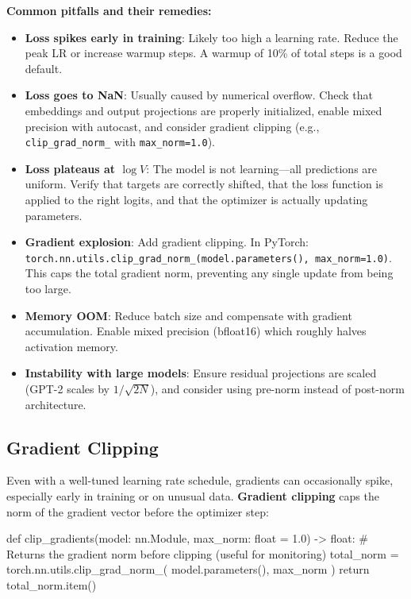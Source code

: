 \begin{keyconcept}
  \textbf{Common pitfalls and their remedies:}
  \begin{itemize}
    \item \textbf{Loss spikes early in training}: Likely too high a learning rate. Reduce the peak LR or increase warmup steps. A warmup of 10\% of total steps is a good default.
    \item \textbf{Loss goes to NaN}: Usually caused by numerical overflow. Check that embeddings and output projections are properly initialized, enable mixed precision with autocast, and consider gradient clipping (e.g., \texttt{clip\_grad\_norm\_} with \texttt{max\_norm=1.0}).
    \item \textbf{Loss plateaus at $\log V$}: The model is not learning---all predictions are uniform. Verify that targets are correctly shifted, that the loss function is applied to the right logits, and that the optimizer is actually updating parameters.
    \item \textbf{Gradient explosion}: Add gradient clipping. In PyTorch: \texttt{torch.nn.utils.clip\_grad\_norm\_(model.parameters(), max\_norm=1.0)}. This caps the total gradient norm, preventing any single update from being too large.
    \item \textbf{Memory OOM}: Reduce batch size and compensate with gradient accumulation. Enable mixed precision (bfloat16) which roughly halves activation memory.
    \item \textbf{Instability with large models}: Ensure residual projections are scaled (GPT-2 scales by $1/\sqrt{2N}$), and consider using pre-norm instead of post-norm architecture.
  \end{itemize}
\end{keyconcept}

\subsection{Gradient Clipping}

Even with a well-tuned learning rate schedule, gradients can occasionally spike, especially early in training or on unusual data. \textbf{Gradient clipping} caps the norm of the gradient vector before the optimizer step:

\begin{pseudocode}
def clip_gradients(model: nn.Module, max_norm: float = 1.0) -> float:
    # Returns the gradient norm before clipping (useful for monitoring)
    total_norm = torch.nn.utils.clip_grad_norm_(
        model.parameters(), max_norm
    )
    return total_norm.item()
\end{pseudocode}

